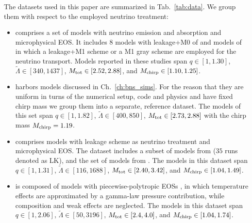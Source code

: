 The datasets used in this paper are summarized in Tab.~\ref{tab:data}.
We group them with respect to the employed neutrino treatment:

\begin{itemize}
    \item \DSheatcool{} comprises a set of models with neutrino emission 
    and absorption and microphysical \ac{EOS}. It includes 
    $8$ models with leakage+M0 of \citet{Radice:2018pdn} and models 
    of \citet{Sekiguchi:2015dma,Sekiguchi:2016bjd,Vincent:2019kor}
    in which a leakage+M1 scheme or a M1 gray scheme are employed for the neutrino transport. 
    Models reported in these studies span 
    $q\in[1, 1.30]$, 
    $\tilde{\Lambda}\in[340, 1437]$, 
    $M_{\rm tot}\in[2.52,2.88]$, 
    and $M_{\rm chirp}\in[1.10,1.25]$.
    \item \DSrefset{} harbors models 
    discussed in Ch.~\ref{ch:bns_sims}.
    For the reason that they are uniform in turns of the 
    numerical setup, code and physics and have fixed chirp mass 
    we group them into a separate, reference dataset. 
    The models of this set span $q\in[1, 1.82]$, 
    $\tilde{\Lambda}\in[400, 850]$, 
    $M_{\rm tot}\in[2.73,2.88]$ with 
    the chirp mass $M_{\rm chirp}=1.19$.
    \item \DScool{} comprises models with leakage scheme as neutrino treatment and 
    microphysical \ac{EOS}. The dataset includes a subset of models from 
    \citet{Radice:2018pdn} ($35$ runs denoted as LK),
    and the set of models from \citet{Lehner:2016lxy}.
    The models in this dataset span $q\in[1, 1.31]$, 
    $\tilde{\Lambda}\in[116, 1688]$, 
    $M_{\rm tot}\in[2.40,3.42]$, 
    and $M_{\rm chirp}\in[1.04,1.49]$.
    \item \DSnone{} is composed of models with piecewise-polytropic \acp{EOS} 
    \citet{Hotokezaka:2012ze,Dietrich:2015iva,Dietrich:2016hky,
        Kiuchi:2019lls,Bauswein:2013yna},
    in which temperature effects are approximated by a
    gamma-law pressure contribution, while
    composition and weak effects are neglected.
    The models in this dataset span 
    $q\in[1, 2.06]$, 
    $\tilde{\Lambda}\in[50, 3196]$, 
    $M_{\rm tot}\in[2.4,4.0]$, 
    and $M_{\rm chirp}\in[1.04,1.74]$.
\end{itemize}

